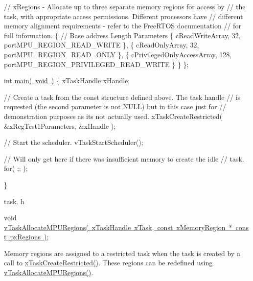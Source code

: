 \begin{DoxyPre}    // xRegions - Allocate up to three separate memory regions for access by
    // the task, with appropriate access permissions.  Different processors have
    // different memory alignment requirements - refer to the FreeRTOS documentation
    // for full information.
    \{
        // Base address                 Length  Parameters
        \{ cReadWriteArray,              32,     portMPU\_REGION\_READ\_WRITE \},
        \{ cReadOnlyArray,               32,     portMPU\_REGION\_READ\_ONLY \},
        \{ cPrivilegedOnlyAccessArray,   128,    portMPU\_REGION\_PRIVILEGED\_READ\_WRITE \}
    \}
\};\end{DoxyPre}



\begin{DoxyPre}int \mbox{\hyperlink{_my_free_r_t_o_s_project_8c_a840291bc02cba5474a4cb46a9b9566fe}{main( void )}}
\{
xTaskHandle xHandle;
\begin{DoxyVerb}// Create a task from the const structure defined above.  The task handle
// is requested (the second parameter is not NULL) but in this case just for
// demonstration purposes as its not actually used.
xTaskCreateRestricted( &xRegTest1Parameters, &xHandle );

// Start the scheduler.
vTaskStartScheduler();

// Will only get here if there was insufficient memory to create the idle
// task.
for( ;; );
\end{DoxyVerb}

\}
   \end{DoxyPre}


task. h 
\begin{DoxyPre}
 void \mbox{\hyperlink{task_8h_a4fd3da9cc010ebb08743f613763c7924}{vTaskAllocateMPURegions( xTaskHandle xTask, const xMemoryRegion * const pxRegions )}};\end{DoxyPre}


Memory regions are assigned to a restricted task when the task is created by a call to \mbox{\hyperlink{task_8h_a61b00cd623953f4f94fe794057d7f648}{x\+Task\+Create\+Restricted()}}. These regions can be redefined using \mbox{\hyperlink{task_8h_a4fd3da9cc010ebb08743f613763c7924}{v\+Task\+Allocate\+M\+P\+U\+Regions()}}.


